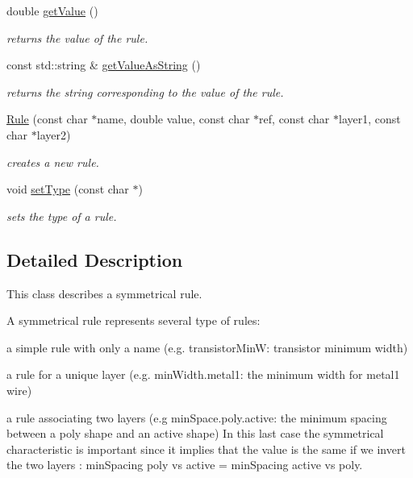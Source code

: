 \begin{DoxyCompactItemize}
double \hyperlink{class_d_t_r_1_1_rule_a666f992950731c68de1ad441f80f228c}{get\+Value} ()
\begin{DoxyCompactList}\small\item\em returns the value of the rule. \end{DoxyCompactList}\item 
\mbox{\label{class_d_t_r_1_1_rule_a3fad3e4886891e1efcdca530d2f6daa3}} 
const std\+::string \& \hyperlink{class_d_t_r_1_1_rule_a3fad3e4886891e1efcdca530d2f6daa3}{get\+Value\+As\+String} ()
\begin{DoxyCompactList}\small\item\em returns the string corresponding to the value of the rule. \end{DoxyCompactList}\item 
\hyperlink{class_d_t_r_1_1_rule_aee8c5385eba121203f788a012b502e24}{Rule} (const char $\ast$name, double value, const char $\ast$ref, const char $\ast$layer1, const char $\ast$layer2)
\begin{DoxyCompactList}\small\item\em creates a new rule. \end{DoxyCompactList}\item 
void \hyperlink{class_d_t_r_1_1_rule_a3568407d7a7890c39b8c9acc1e608535}{set\+Type} (const char $\ast$)
\begin{DoxyCompactList}\small\item\em sets the type of a rule. \end{DoxyCompactList}\end{DoxyCompactItemize}


\subsection{Detailed Description}
This class describes a symmetrical rule.

A symmetrical rule represents several type of rules\+:
\begin{DoxyItemize}
\item a simple rule with only a name (e.\+g. transistor\+MinW\+: transistor minimum width)
\item a rule for a unique layer (e.\+g. min\+Width.\+metal1\+: the minimum width for metal1 wire)
\item a rule associating two layers (e.\+g min\+Space.\+poly.\+active\+: the minimum spacing between a poly shape and an active shape) In this last case the symmetrical characteristic is important since it implies that the value is the same if we invert the two layers \+: min\+Spacing poly vs active = min\+Spacing active vs poly.
\end{DoxyItemize}

